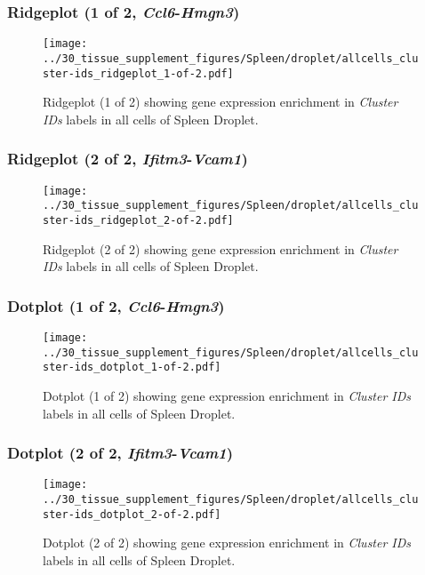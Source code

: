 \clearpage

\subsubsection{Ridgeplot (1 of 2, \emph{Ccl6}-\emph{Hmgn3})}
\begin{figure}[h]
\centering
\texttt{[image: ../30\_tissue\_supplement\_figures/Spleen/droplet/allcells\_cluster-ids\_ridgeplot\_1-of-2.pdf]}

\caption{ Ridgeplot (1 of 2)  showing gene expression enrichment in \emph{Cluster IDs} labels in all cells of Spleen Droplet. }
\end{figure}


\clearpage

\subsubsection{Ridgeplot (2 of 2, \emph{Ifitm3}-\emph{Vcam1})}
\begin{figure}[h]
\centering
\texttt{[image: ../30\_tissue\_supplement\_figures/Spleen/droplet/allcells\_cluster-ids\_ridgeplot\_2-of-2.pdf]}

\caption{ Ridgeplot (2 of 2)  showing gene expression enrichment in \emph{Cluster IDs} labels in all cells of Spleen Droplet. }
\end{figure}


\clearpage

\subsubsection{Dotplot (1 of 2, \emph{Ccl6}-\emph{Hmgn3})}
\begin{figure}[h]
\centering
\texttt{[image: ../30\_tissue\_supplement\_figures/Spleen/droplet/allcells\_cluster-ids\_dotplot\_1-of-2.pdf]}

\caption{ Dotplot (1 of 2)  showing gene expression enrichment in \emph{Cluster IDs} labels in all cells of Spleen Droplet. }
\end{figure}


\clearpage

\subsubsection{Dotplot (2 of 2, \emph{Ifitm3}-\emph{Vcam1})}
\begin{figure}[h]
\centering
\texttt{[image: ../30\_tissue\_supplement\_figures/Spleen/droplet/allcells\_cluster-ids\_dotplot\_2-of-2.pdf]}

\caption{ Dotplot (2 of 2)  showing gene expression enrichment in \emph{Cluster IDs} labels in all cells of Spleen Droplet. }
\end{figure}


